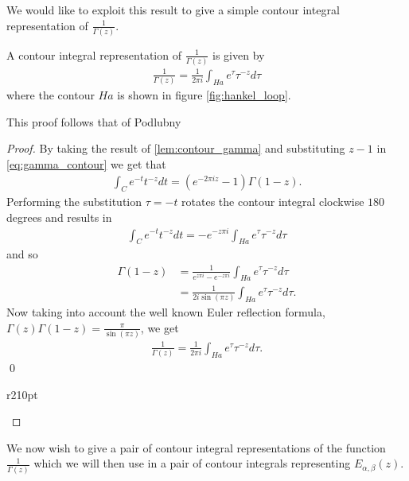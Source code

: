 We would like to exploit this result to give a simple contour integral representation of $ \frac{1}{\Gamma(z)} $.

\begin{lemma}
    \label{lem:contour_1_gamma_1}
    A contour integral representation of $ \frac{1}{\Gamma(z)} $ is given by
    \begin{align*}
        \frac{1}{\Gamma(z)} = \frac{1}{2 \pi i} \int_{Ha} e^\tau \tau^{-z} d\tau
    \end{align*}
    where the contour $ Ha $ is shown in figure \ref{fig:hankel_loop}.
\end{lemma}
This proof follows that of Podlubny \cite{Podlubny1999}
\begin{proof}
    By taking the result of \ref{lem:contour_gamma} and substituting $ z-1 $ in \eqref{eq:gamma_contour}
    we get that
    \begin{align*}
        \int_C e^{-t} t^{-z} dt = (e^{-2 \pi i z} -1) \Gamma(1-z).
    \end{align*}
    Performing the substitution $ \tau = -t $ rotates the contour integral clockwise $ 180 $ degrees 
    and results in 
    \begin{align*}
        \int_{C} e^{-t} t^{-z} dt = - e^{-z\pi i}\int_{Ha} e^{\tau} \tau^{-z} d\tau
    \end{align*}
    and so
    \begin{align*}
        \Gamma(1-z) &= \frac{1}{e^{z\pi i} - e^{-z \pi i}} \int_{Ha} e^\tau \tau^{-z} d\tau \\
            &= \frac{1}{2i \sin(\pi z)}\int_{Ha} e^\tau \tau^{-z} d\tau.
    \end{align*}
    Now taking into account the well known Euler reflection formula, $ \Gamma(z)\Gamma(1-z) = \frac{\pi}{\sin(\pi z)} $, we get
    \begin{align*}
        \frac{1}{\Gamma(z)} = \frac{1}{2 \pi i} \int_{Ha} e^\tau \tau^{-z} d\tau.
    \end{align*} \qed
    \begin{wrapfigure}{r}{210pt}
        
        \caption{The Hankel contour Ha}
        \label{fig:hankel_loop}
    \end{wrapfigure}
\end{proof}

We now wish to give a pair of contour integral representations of the function $ \frac{1}{\Gamma(z)} $
which we will then use in a pair of contour integrals representing $ E_{\alpha, \beta}(z) $. 


